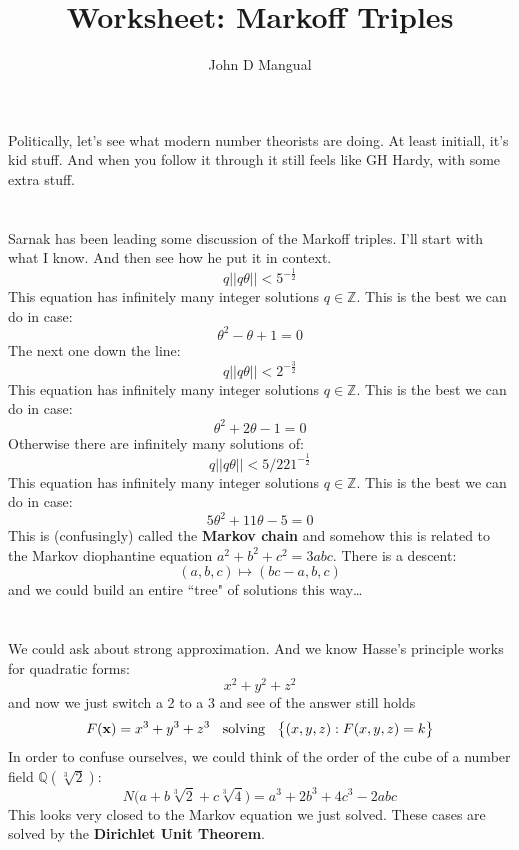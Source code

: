 \documentclass[12pt]{article}
\title{Worksheet: Markoff Triples}
\author{John D Mangual}
\date{}
\begin{document}
\selectfont \fontsize{12.5}{15}\selectfont

\maketitle

\noindent Politically, let's see what modern number theorists are doing.  At least initiall, it's kid stuff.  And when you follow it through it still feels like GH Hardy, with some extra stuff.   \\ \\ \\
Sarnak has been leading some discussion of the Markoff triples.  I'll start with what I know. And then see how he put it in context.
$$ q || q \theta || <  5^{-\tfrac{1}{2}} $$
This equation has infinitely many integer solutions $q \in \mathbb{Z}$.  This is the best we can do in case:
$$ \theta^2 - \theta + 1 = 0 $$
The next one down the line:
$$ q || q \theta || <  2^{-\tfrac{3}{2}} $$
This equation has infinitely many integer solutions $q \in \mathbb{Z}$.  This is the best we can do in case:
$$ \theta^2 +2\theta - 1 = 0 $$
Otherwise there are infinitely many solutions of:
$$ q || q \theta || <  5/221^{-\tfrac{1}{2}} $$
This equation has infinitely many integer solutions $q \in \mathbb{Z}$.  This is the best we can do in case:
$$ 5\theta^2 + 11\theta - 5 = 0 $$
This is (confusingly) called the \textbf{Markov chain} and somehow this is related to the Markov diophantine equation $ a^2 + b^2 + c^2  = 3abc $.  There is a descent:
$$ (a,b,c) \mapsto ( bc - a , b, c) $$
and we could build an entire ``tree" of solutions this way\dots \\ \\ \\
We could ask about strong approximation.  And we know Hasse's principle works for quadratic forms:
$$ x^2 + y^2 + z^2 $$
and now we just switch a 2 to a 3 and see of the answer still holds
$$ F(\mathbf{x}) = x^3 + y^3 + z^3 \hspace{0.125in}\text{solving}\hspace{0.125in}
\big\{ (x,y,z) : F(x,y,z) = k \big\} $$
In order to confuse ourselves, we could think of the order of the cube of a number field $\mathbb{Q}(\sqrt[3]{2})$:
$$ N\big( a + b \sqrt[3]{2} + c \sqrt[3]{4}\big) 
= a^3 + 2b^3 + 4 c^3 - 2abc$$
This looks very closed to the Markov equation we just solved.  These cases are solved by the \textbf{Dirichlet Unit Theorem}.

\newpage
\end{document}
